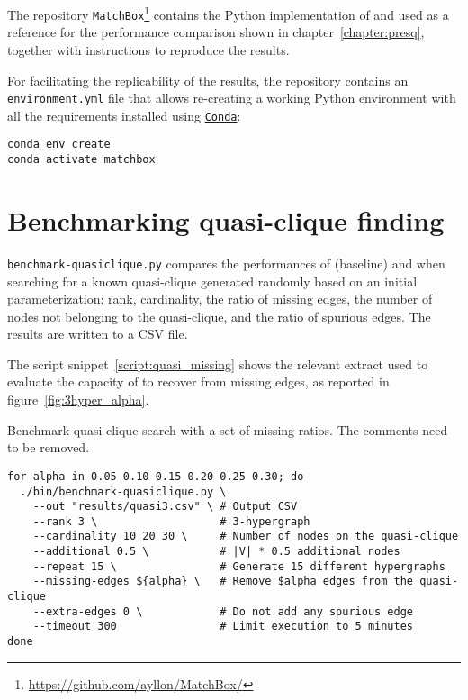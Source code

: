 The repository \texttt{MatchBox}\footnote{\url{https://github.com/ayllon/MatchBox/}}
contains the Python implementation of \PresQ and \Find used as a reference for the
performance comparison shown in chapter~\ref{chapter:presq}, together with instructions
to reproduce the results.

For facilitating the replicability of the results, the repository contains an \linebreak
\texttt{environment.yml} file that allows re-creating a working Python environment
with all the requirements installed using \href{https://docs.conda.io/en/latest/}{\texttt{Conda}}:

\begin{verbatim}
conda env create
conda activate matchbox
\end{verbatim}

\section{Benchmarking quasi-clique finding}

\texttt{benchmark-quasiclique.py} compares the performances of \Find (baseline) and \PresQ
when searching for a known quasi-clique generated randomly based on an initial parameterization:
rank, cardinality, the ratio of missing edges, the number of nodes not belonging to the
quasi-clique, and the ratio of spurious edges. The results are written to a \gls{CSV} file.

The script snippet~\ref{script:quasi_missing} shows the relevant extract used to evaluate
the capacity of \PresQ to recover from missing edges, as reported in figure~\ref{fig:3hyper_alpha}.

\begin{code}
\caption[Benchmark quasi-clique search with a set of missing ratios.]{
Benchmark quasi-clique search with a set of missing ratios. The comments need to be removed.}\label{script:quasi_missing}
\begin{verbatim}
for alpha in 0.05 0.10 0.15 0.20 0.25 0.30; do
  ./bin/benchmark-quasiclique.py \
    --out "results/quasi3.csv" \ # Output CSV
    --rank 3 \                   # 3-hypergraph
    --cardinality 10 20 30 \     # Number of nodes on the quasi-clique
    --additional 0.5 \           # |V| * 0.5 additional nodes
    --repeat 15 \                # Generate 15 different hypergraphs
    --missing-edges ${alpha} \   # Remove $alpha edges from the quasi-clique
    --extra-edges 0 \            # Do not add any spurious edge
    --timeout 300                # Limit execution to 5 minutes
done
\end{verbatim}
\end{code}

